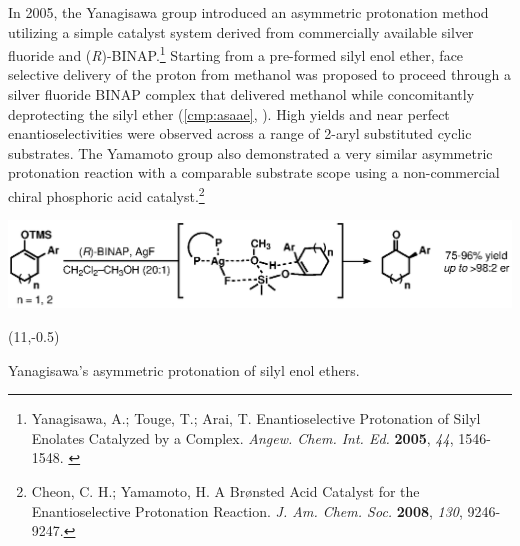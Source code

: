 In 2005, the Yanagisawa group introduced an asymmetric protonation method utilizing a simple
catalyst system derived from commercially available silver fluoride and (\textit{R})-BINAP.\footnote{{\frenchspacing Yanagisawa, A.; Touge, T.; Arai, T.
Enantioselective Protonation of Silyl Enolates Catalyzed by a
 Complex. \textit{Angew. Chem. Int. Ed.} \textbf{2005}, \textit{44}, 1546-1548.}
\label{ref:asyanagisawa}} Starting from a pre-formed silyl enol ether, face selective delivery of
the proton from methanol was proposed to proceed through a silver fluoride BINAP complex that delivered methanol while
concomitantly deprotecting the silyl ether (\ref{cmp:asaae}, ). High
yields and near perfect enantioselectivities were observed across a range of 2-aryl substituted cyclic substrates. The
Yamamoto group also demonstrated a very similar asymmetric protonation reaction with a comparable
substrate scope using a non-commercial chiral phosphoric acid catalyst.\footnote{{\frenchspacing
Cheon, C.
H.; Yamamoto, H.
A Br\o nsted Acid Catalyst for the Enantioselective Protonation Reaction. \textit{J. Am. Chem. Soc.}
 \textbf{2008}, \textit{130}, 9246-9247.}}  
\begin{Scheme}[h]
  \centering
  \includegraphics[scale=0.8]{chp_asymmetric/images/yanagisawaproton}
  \begin{textblock}{1}(11,-0.5)  \end{textblock}
  \caption{Yanagisawa's asymmetric protonation of silyl enol ethers.}
  \label{sch:asyanagisawaproton}
\end{Scheme}  
 
 
 
